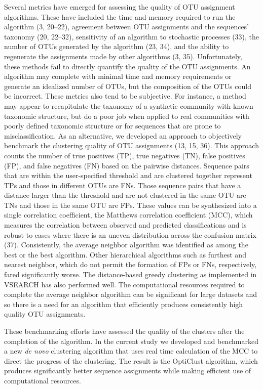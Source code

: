 \documentclass[11pt,]{article}
\begin{document}
Several metrics have emerged for assessing the quality of OTU assignment
algorithms. These have included the time and memory required to run the
algorithm (3, 20--22), agreement between OTU assignments and the
sequences' taxonomy (20, 22--32), sensitivity of an algorithm to
stochastic processes (33), the number of OTUs generated by the algorithm
(23, 34), and the ability to regenerate the assignments made by other
algorithms (3, 35). Unfortunately, these methods fail to directly
quantify the quality of the OTU assignments. An algorithm may complete
with minimal time and memory requirements or generate an idealized
number of OTUs, but the composition of the OTUs could be incorrect.
These metrics also tend to be subjective. For instance, a method may
appear to recapitulate the taxonomy of a synthetic community with known
taxonomic structure, but do a poor job when applied to real communities
with poorly defined taxonomic structure or for sequences that are prone
to misclassification. As an alternative, we developed an approach to
objectively benchmark the clustering quality of OTU assignments (13, 15,
36). This approach counts the number of true positives (TP), true
negatives (TN), false positives (FP), and false negatives (FN) based on
the pairwise distances. Sequence pairs that are within the
user-specified threshold and are clustered together represent TPs and
those in different OTUs are FNs. Those sequence pairs that have a
distance larger than the threshold and are not clustered in the same OTU
are TNs and those in the same OTU are FPs. These values can be
synthesized into a single correlation coefficient, the Matthews
correlation coefficient (MCC), which measures the correlation between
observed and predicted classifications and is robust to cases where
there is an uneven distribution across the confusion matrix (37).
Consistently, the average neighbor algorithm was identified as among the
best or the best algorithm. Other hierarchical algorithms such as
furthest and nearest neighbor, which do not permit the formation of FPs
or FNs, respectively, fared significantly worse. The distance-based
greedy clustering as implemented in VSEARCH has also performed well. The
computational resources required to complete the average neighbor
algorithm can be significant for large datasets and so there is a need
for an algorithm that efficiently produces consistently high quality OTU
assignments.

These benchmarking efforts have assessed the quality of the clusters
after the completion of the algorithm. In the current study we developed
and benchmarked a new \emph{de novo} clustering algorithm that uses real
time calculation of the MCC to direct the progress of the clustering.
The result is the OptiClust algorithm, which produces significantly
better sequence assignments while making efficient use of computational
resources.
\end{document}
